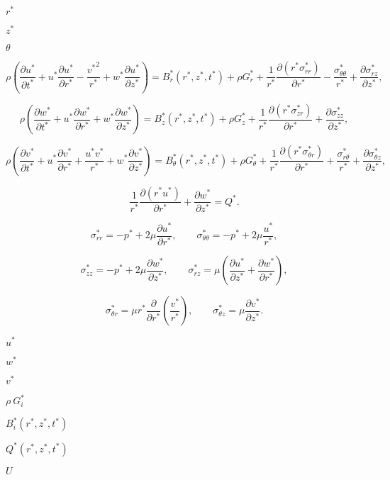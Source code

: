 \documentclass{article}
\begin{document}
$ r^* $
\pagebreak

$ z^* $
\pagebreak

$ \theta $
\pagebreak

\[ \rho\left(\frac{\partial u^*}{\partial t^*} + {u^*}\frac{\partial u^*}{\partial r^*} - \frac{{v^*}^2}{r^*} + {w^*}\frac{\partial u^*}{\partial z^*} \right) = B_r^*\left(r^*,z^*,t^*\right)+ \rho G_r^*+ \frac{1}{r^*} \frac{\partial\left({r^*}\sigma_{rr}^*\right)}{\partial r^*} - \frac{\sigma_{\theta\theta}^*}{r^*} + \frac{\partial\sigma_{rz}^*}{\partial z^*}, \]
\pagebreak

\[ \rho\left(\frac{\partial w^*}{\partial t^*} + {u^*}\frac{\partial w^*}{\partial r^*} + {w^*}\frac{\partial w^*}{\partial z^*} \right) = B_z^*\left(r^*,z^*,t^*\right)+\rho G_z^*+ \frac{1}{r^*}\frac{\partial\left({r^*}\sigma_{zr}^*\right)}{\partial r^*} + \frac{\partial\sigma_{zz}^*}{\partial z^*}, \]
\pagebreak

\[ \rho\left(\frac{\partial v^*}{\partial t^*} + {u^*}\frac{\partial v^*}{\partial r^*} + \frac{u^* v^*}{r^*} +{w^*}\frac{\partial v^*}{\partial z^*} \right)= B_\theta^*\left(r^*,z^*,t^*\right)+ \rho G_\theta^*+ \frac{1}{r^*}\frac{\partial\left({r^*}\sigma_{\theta r}^*\right)}{\partial r^*} + \frac{\sigma_{r\theta}^*}{r^*} + \frac{\partial\sigma_{\theta z}^*}{\partial z^*}, \]
\pagebreak

\[ \frac{1}{r^*}\frac{\partial\left(r^*u^*\right)}{\partial r^*} + \frac{\partial w^*}{\partial z^*} = Q^*. \]
\pagebreak

\[ \sigma_{rr}^* = -p^* + 2\mu\frac{\partial u^*}{\partial r^*}, \qquad \sigma_{\theta\theta}^* = -p^* +2\mu\frac{u^*}{r^*}, \]
\pagebreak

\[ \sigma_{zz}^* = -p^* + 2\mu\frac{\partial w^*}{\partial z^*}, \qquad \sigma_{rz}^* = \mu\left(\frac{\partial u^*}{\partial z^*} + \frac{\partial w^*}{\partial r^*}\right), \]
\pagebreak

\[ \sigma_{\theta r}^* = \mu r^*\frac{\partial}{\partial r^*} \left(\frac{v^*}{r^*}\right), \qquad \sigma_{\theta z}^* = \mu\frac{\partial v^*}{\partial z^*}. \]
\pagebreak

$ u^* $
\pagebreak

$ w^* $
\pagebreak

$ v^* $
\pagebreak

$ \rho \ G_i^* $
\pagebreak

$ B_i^*(r^*,z^*,t^*) $
\pagebreak

$ Q^*(r^*,z^*,t^*) $
\pagebreak

$ U $
\pagebreak
\end{document}
